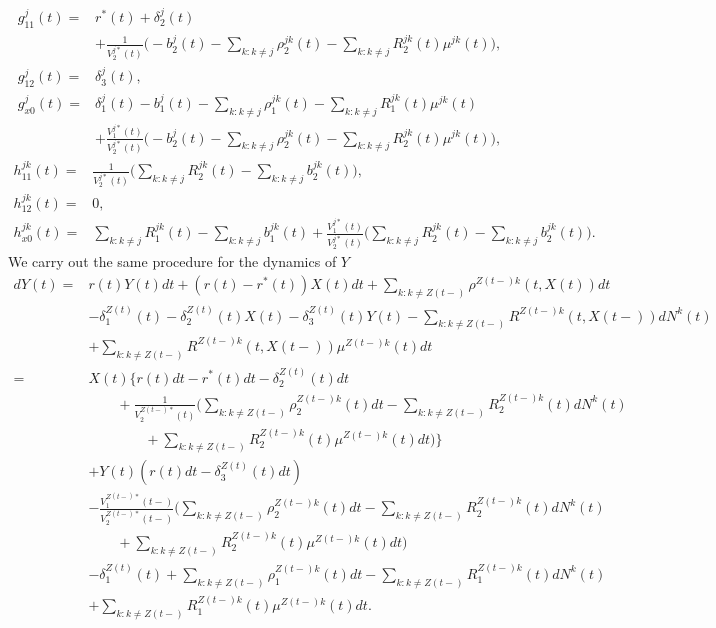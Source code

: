 \documentclass[12pt]{article}
\theoremstyle{my_thm}
\begin{document}
\begin{align*}
g^j_{11}(t)=&r^*(t)  +\delta_2^j(t)\\
&+\frac{1}{V_2^{j*}(t)}\bigg(
-b^j_2(t)-\sum_{k:k\neq j}\rho_2^{jk}(t)-\sum_{k:k\neq j}R_2^{jk}(t)\mu^{jk}(t)
\bigg),
\\
g^j_{12}(t)=&\delta_3^j(t),
\\
g^j_{x0}(t)=& \delta_1^{j}(t) 
-b_1^{j}(t)
-\sum_{k:k\neq j} \rho^{jk}_1(t) -\sum_{k:k\neq j} R^{jk}_1(t) \mu^{jk}(t)
\\
&+
\frac{V^{j*}_1(t)}{V^{j*}_2(t)}
\bigg( -b_2^{j}(t)-\sum_{k:k\neq j} \rho^{jk}_2(t) -\sum_{k:k\neq j} R^{jk}_2(t) \mu^{jk}(t) \bigg),
\end{align*}
\begin{align*}
h^{jk}_{11}(t)=& \frac{1}{V_2^{j*}(t)} \bigg( 
\sum_{k:k\neq j}R_2^{jk}(t)-\sum_{k:k\neq j}b_2^{jk}(t)
\bigg),
\\
h^{jk}_{12}(t)=& 0 ,
\\
h^{jk}_{x0}(t)=& 
\sum_{k:k\neq j} R^{jk}_1(t) -\sum_{k:k\neq j}b_1^{jk}(t)
+
\frac{V^{j*}_1(t)}{V^{j*}_2(t)}
\bigg( \sum_{k:k\neq j} R^{jk}_2(t)-\sum_{k:k\neq j}b_2^{jk}(t)  \bigg).
\end{align*}
We carry out the same procedure for the dynamics of $Y$
\begin{align*}
dY(t)=&
r(t) Y(t) dt +(r(t)-r^*(t))X(t)dt+\sum_{k:k\neq Z(t-)} \rho^{Z(t-)k}(t,X(t)) dt
\\
&-\delta_1^{Z(t)}(t)-\delta_2^{Z(t)}(t)X(t)-\delta_3^{Z(t)}(t)Y(t)-
\sum_{k:k \neq Z(t-)}  R^{Z(t-)k}(t,X(t-)) dN^k(t)
\\
&+
\sum_{k:k \neq Z(t-)}  R^{Z(t-)k}(t,X(t-)) \mu^{Z(t-)k}(t) dt
\\
=&
X(t) \bigg\lbrace 
r(t)dt-r^*(t)dt -\delta_2^{Z(t)}(t)dt
\\
& \qquad + \frac{1}{V_2^{Z(t-)*}(t)} \bigg( 
\sum_{k:k\neq Z(t-)} \rho_2^{Z(t-)k}(t) dt
-\sum_{k:k \neq Z(t-)}  R^{Z(t-)k}_2(t) dN^k(t)
\\
&
\qquad \qquad +\sum_{k:k \neq Z(t-)}  R^{Z(t-)k}_2(t) \mu^{Z(t-)k}(t) dt
\bigg)
\bigg\rbrace
\\
&+ Y(t)( 
r(t) dt-\delta_3^{Z(t)}(t) dt)
\\
&- \frac{V_1^{Z(t-)*}(t-)}{V_2^{Z(t-)*}(t-)}\bigg(
\sum_{k:k\neq Z(t-)} \rho^{Z(t-)k}_2(t) dt
-\sum_{k:k\neq Z(t-)} R^{Z(t-)k}_2(t) dN^k(t)
\\
&\qquad  +\sum_{k:k\neq Z(t-)} R^{Z(t-)k}_2(t) \mu^{Z(t-)k}(t) dt
\bigg)
\\
&-\delta_1^{Z(t)}(t)
+
\sum_{k:k\neq Z(t-)} \rho^{Z(t-)k}_1(t) dt
-
\sum_{k:k \neq Z(t-)}  R_1^{Z(t-)k}(t) dN^k(t)
\\&
+\sum_{k:k \neq Z(t-)}  R_1^{Z(t-)k}(t) \mu^{Z(t-)k}(t) dt.
\end{align*}
\end{document}
